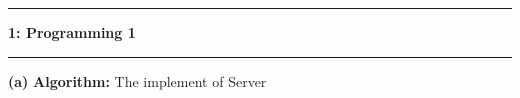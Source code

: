 \documentclass[11pt]{article}
\newcommand\question[2]{\vspace{.25in}\hrule\textbf{#1: #2}\vspace{.5em}\hrule\vspace{.10in}}
\renewcommand\part[1]{\vspace{.10in}\textbf{(#1)}}
\newcommand\algorithm{\vspace{.10in}\textbf{Algorithm: }}
\begin{document}
\raggedright
\newcommand\NAME{Yao Xiao}  %
\newcommand\ANDREWID{2019180015}     %
\newcommand\HWNUM{1}              %


\question{1}{Programming 1} 

\part{a} \algorithm The implement of Server
\end{document}
